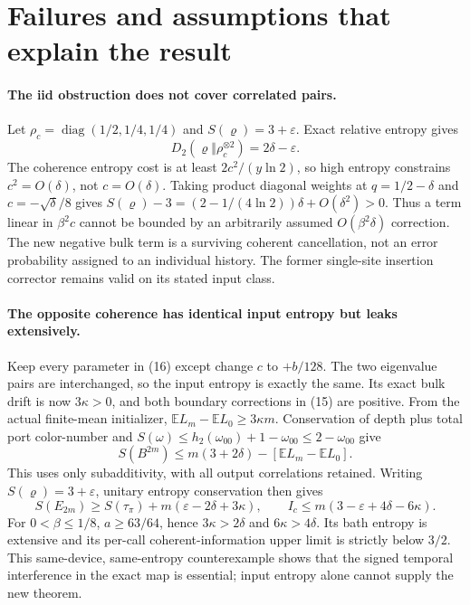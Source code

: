\documentclass[11pt]{article}
\newcommand{\E}{\mathbb E}
\begin{document}
\section{Failures and assumptions that explain the result}

\paragraph{The iid obstruction does not cover correlated pairs.}
Let $\rho_c=\operatorname{diag}(1/2,1/4,1/4)$ and
$S(\varrho)=3+\varepsilon$. Exact relative entropy gives
\[
 D_2(\varrho\Vert\rho_c^{\otimes2})=2\delta-\varepsilon.
 \tag{37}
\]
The coherence entropy cost is at least $2c^2/(y\ln2)$, so high entropy
constrains $c^2=O(\delta)$, not $c=O(\delta)$.
Taking product diagonal weights at $q=1/2-\delta$ and
$c=-\sqrt\delta/8$ gives
$S(\varrho)-3=(2-1/(4\ln2))\delta+O(\delta^2)>0$.
Thus a term linear in $\beta^2c$ cannot be bounded by an arbitrarily assumed
$O(\beta^2\delta)$ correction. The new negative bulk term is a surviving
coherent cancellation, not an error probability assigned to an individual
history. The former single-site insertion corrector remains valid on its
stated input class.

\paragraph{The opposite coherence has identical input entropy but leaks extensively.}
Keep every parameter in (16) except change $c$ to $+b/128$. The two eigenvalue
pairs are interchanged, so the input entropy is exactly the same. Its exact
bulk drift is now $3\kappa>0$, and both boundary corrections in (15) are
positive. From the actual finite-mean initializer,
$\E L_m-\E L_0\ge3\kappa m$.
Conservation of depth plus total port color-number and
$S(\omega)\le h_2(\omega_{00})+1-\omega_{00}\le2-\omega_{00}$ give
\[
 S(B^{2m})\le m(3+2\delta)-[\E L_m-\E L_0].
\]
This uses only subadditivity, with all output correlations retained.
Writing $S(\varrho)=3+\varepsilon$, unitary entropy conservation then gives
\[
 S(E_{2m})\ge S(\tau_\pi)+m(\varepsilon-2\delta+3\kappa),\qquad
 I_c\le m(3-\varepsilon+4\delta-6\kappa).
 \tag{38}
\]
For $0<\beta\le1/8$, $a\ge63/64$, hence $3\kappa>2\delta$ and
$6\kappa>4\delta$. Its bath entropy is extensive and its per-call
coherent-information upper limit is strictly below $3/2$. This same-device,
same-entropy counterexample shows that the signed temporal interference in
the exact map is essential; input entropy alone cannot supply the new theorem.
\end{document}
